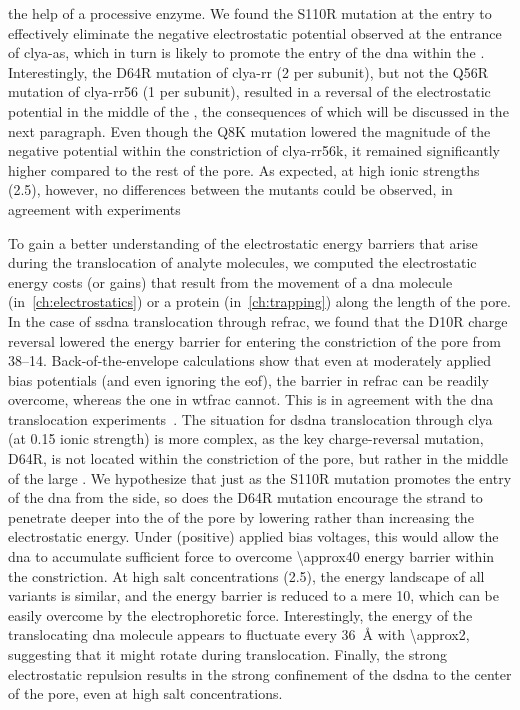 the help of a processive enzyme. We found the S110R mutation at the \cisi{} entry to effectively eliminate the
negative electrostatic potential observed at the \cisi{} entrance of \gls{clya-as}, which in turn is likely to
promote the entry of the \gls{dna} within the \lumen{}. Interestingly, the D64R mutation of \gls{clya-rr}
(\SI{+2}{\ec} per subunit), but not the Q56R mutation of \gls{clya-rr56} (\SI{+1}{\ec} per subunit), resulted
in a reversal of the electrostatic potential in the middle of the \lumen{}, the consequences of which will be
discussed in the next paragraph. Even though the Q8K mutation lowered the magnitude of the negative potential
within the constriction of \gls{clya-rr56k}, it remained significantly higher compared to the rest of the
pore. As expected, at high ionic strengths (\SI{2.5}{\Molar}), however, no differences between the mutants
could be observed, in agreement with experiments~\cite{Franceschini-2013,Franceschini-2016}

To gain a better understanding of the electrostatic energy barriers that arise during the translocation of
analyte molecules, we computed the electrostatic energy costs (or gains) that result from the movement of a
\gls{dna} molecule (in~\cref{ch:electrostatics}) or a protein (in~\cref{ch:trapping}) along the length of the
pore. In the case of \gls{ssdna} translocation through \gls{refrac}, we found that the D10R charge reversal
lowered the energy barrier for entering the constriction of the pore from \SIrange{38}{14}{\kbt}.
Back-of-the-envelope calculations show that even at moderately applied bias potentials (and even ignoring the
\gls{eof}), the barrier in \gls{refrac} can be readily overcome, whereas the one in \gls{wtfrac} cannot. This
is in agreement with the \gls{dna} translocation experiments~\cite{Wloka-2016}. The situation for \gls{dsdna}
translocation through \gls{clya} (at \SI{0.15}{\Molar} ionic strength) is more complex, as the key
charge-reversal mutation, D64R, is not located within the constriction of the pore, but rather in the middle
of the large \cisi{} \lumen{}. We hypothesize that just as the S110R mutation promotes the entry of the
\gls{dna} from the \cisi{} side, so does the D64R mutation encourage the strand to penetrate deeper into the
\lumen{} of the pore by lowering rather than increasing the electrostatic energy. Under (positive) applied
bias voltages, this would allow the \gls{dna} to accumulate sufficient force to overcome \SI{\approx40}{\kbt}
energy barrier within the constriction. At high salt concentrations (\SI{2.5}{\Molar}), the energy landscape
of all variants is similar, and the energy barrier is reduced to a mere \SI{10}{\kbt}, which can be easily
overcome by the electrophoretic force. Interestingly, the energy of the translocating \gls{dna} molecule
appears to fluctuate every \SI{36}{\angstrom} with \SI{\approx2}{\kbt}, suggesting that it might rotate during
translocation. Finally, the strong electrostatic repulsion results in the strong confinement of the
\gls{dsdna} to the center of the pore, even at high salt concentrations.

